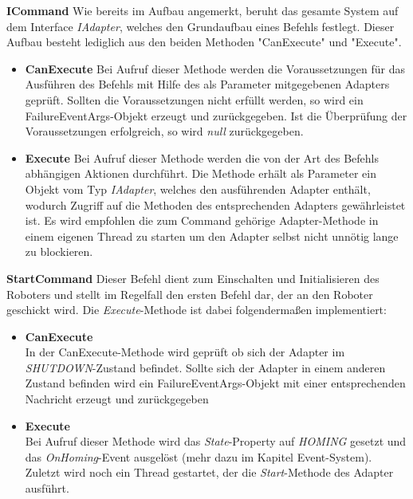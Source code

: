 \textbf{ICommand}
\newline
Wie bereits im Aufbau angemerkt, beruht das gesamte System auf dem Interface \textit{IAdapter}, welches den Grundaufbau eines Befehls festlegt. Dieser Aufbau besteht lediglich aus den beiden Methoden "CanExecute" und "Execute".
\begin{itemize}
\item \textbf{CanExecute}
\newline
Bei Aufruf dieser Methode werden die Voraussetzungen für das Ausführen des Befehls mit Hilfe des als Parameter mitgegebenen Adapters geprüft. Sollten die Voraussetzungen nicht erfüllt werden, so wird ein FailureEventArgs-Objekt erzeugt und zurückgegeben. Ist die Überprüfung der Voraussetzungen erfolgreich, so wird \textit{null} zurückgegeben.
\item \textbf{Execute}
\newline
Bei Aufruf dieser Methode werden die von der Art des Befehls abhängigen Aktionen durchführt. Die Methode erhält als Parameter ein Objekt vom Typ \textit{IAdapter}, welches den ausführenden Adapter enthält, wodurch Zugriff auf die Methoden des entsprechenden Adapters gewährleistet ist. Es wird empfohlen die zum Command gehörige Adapter-Methode in einem eigenen Thread zu starten um den Adapter selbst nicht unnötig lange zu blockieren.
\end{itemize}

\textbf{StartCommand}
\newline
Dieser Befehl dient zum Einschalten und Initialisieren des Roboters und stellt im Regelfall den ersten Befehl dar, der an den Roboter geschickt wird. Die \textit{Execute}-Methode ist dabei folgendermaßen implementiert:
\begin{itemize}
\item \textbf{CanExecute}\\
In der CanExecute-Methode wird geprüft ob sich der Adapter im \textit{SHUTDOWN}-Zustand befindet. Sollte sich der Adapter in einem anderen Zustand befinden wird ein FailureEventArgs-Objekt mit einer entsprechenden Nachricht erzeugt und zurückgegeben
\item \textbf{Execute}\\
Bei Aufruf dieser Methode wird das \textit{State}-Property auf \textit{HOMING} gesetzt und das \textit{OnHoming}-Event ausgelöst (mehr dazu im Kapitel Event-System). Zuletzt wird noch ein Thread gestartet, der die \textit{Start}-Methode des Adapter ausführt.
\end{itemize}

